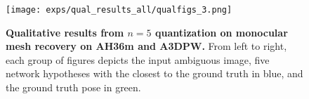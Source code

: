 \begin{figure}[t]
\centering
{\texttt{[image: exps/qual\_results\_all/qualfigs\_3.png]}}
\caption{%
    \textbf{Qualitative results from $n=5$ quantization on monocular mesh recovery on AH36m and A3DPW.} 
    From left to right, each group of figures depicts the input ambiguous image, five network hypotheses with the closest to the ground truth in blue, and the ground truth pose in green.
    }\label{fig:qual_results_all}
\end{figure}